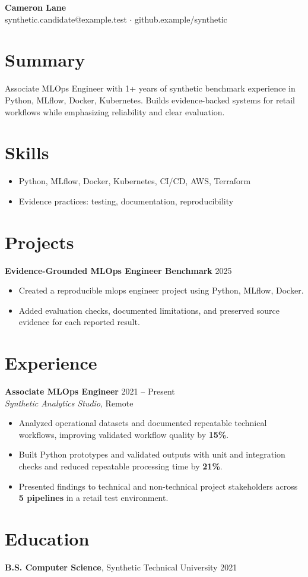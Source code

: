 \documentclass[10pt,letterpaper]{article}
\begin{document}
\begin{center}
{\Large \textbf{Cameron Lane}}\\
synthetic.candidate@example.test $\cdot$ github.example/synthetic
\end{center}

\section*{Summary}
Associate MLOps Engineer with 1+ years of synthetic benchmark experience in Python, MLflow, Docker, Kubernetes. Builds evidence-backed systems for retail workflows while emphasizing reliability and clear evaluation.

\section*{Skills}
\begin{itemize}
  \item Python, MLflow, Docker, Kubernetes, CI/CD, AWS, Terraform
  \item Evidence practices: testing, documentation, reproducibility
\end{itemize}

\section*{Projects}
\textbf{Evidence-Grounded MLOps Engineer Benchmark} \hfill 2025
\begin{itemize}
  \item Created a reproducible mlops engineer project using Python, MLflow, Docker.
  \item Added evaluation checks, documented limitations, and preserved source evidence for each reported result.
\end{itemize}

\section*{Experience}
\textbf{Associate MLOps Engineer} \hfill 2021 -- Present\\
\textit{Synthetic Analytics Studio}, Remote
\begin{itemize}
  \item Analyzed operational datasets and documented repeatable technical workflows, improving validated workflow quality by \textbf{15\%}.
  \item Built Python prototypes and validated outputs with unit and integration checks and reduced repeatable processing time by \textbf{21\%}.
  \item Presented findings to technical and non-technical project stakeholders across \textbf{5 pipelines} in a retail test environment.
\end{itemize}

\section*{Education}
\textbf{B.S. Computer Science}, Synthetic Technical University \hfill 2021
\end{document}
